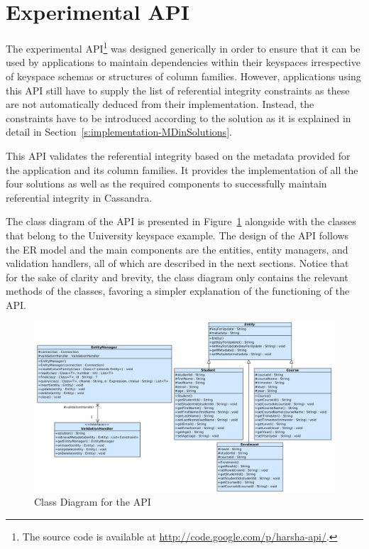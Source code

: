 \section{Experimental API}\label{s:implementation-API}

The experimental \ac{API}\footnote{
The source code is available at \url{http://code.google.com/p/harsha-api/}.
} was designed generically in order to ensure that it
can be used by  applications to maintain dependencies within their keyspaces
irrespective of keyspace schemas or structures of column families.  However,
applications using this \ac{API} still have to supply  the list of referential
integrity constraints as these are not automatically deduced from their
implementation. Instead, the constraints have to be introduced according to the
solution as it is explained in detail in
Section~\ref{s:implementation-MDinSolutions}. 


This \ac{API} validates the referential integrity based on the metadata provided
for the application and its column families.   It  provides the implementation of
all the four solutions as well as the required components to successfully
maintain referential integrity in Cassandra.

The  class diagram of the \ac{API} is presented  in
 Figure~\ref{f:classDiagram} alongside with the  classes that belong to 
the University keyspace example.  The design of the \ac{API} follows the
\ac{ER} model and the main components are the entities, entity managers,  and
validation handlers,  all of which are described in the next sections.
 Notice that for the sake of clarity and brevity,   the class diagram only
 contains  the relevant  methods of the classes,  favoring a simpler
explanation of the functioning of the \ac{API}. 

\begin{landscape}
\begin{figure}[c]
	\centering
	\includegraphics[width=1.45\textwidth]{./figure/uml/class-diagram.png}
	\caption{Class Diagram for the \ac{API}}\label{f:classDiagram}
\end{figure}
\end{landscape}

